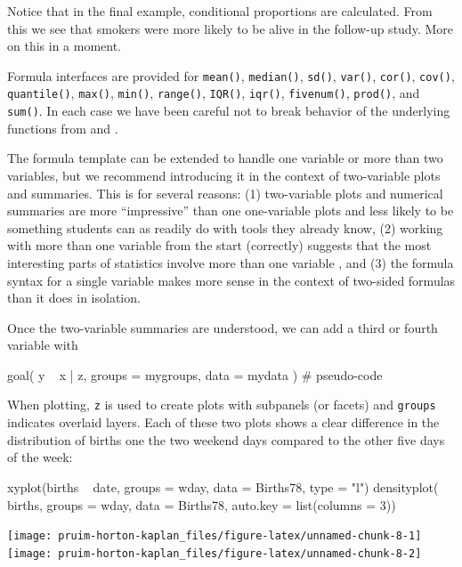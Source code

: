 Notice that in the final example, conditional proportions are
calculated. From this we see that smokers were more likely to be alive
in the follow-up study. More on this in a moment.

Formula interfaces are provided for \texttt{mean()}, \texttt{median()},
\texttt{sd()}, \texttt{var()}, \texttt{cor()}, \texttt{cov()},
\texttt{quantile()}, \texttt{max()}, \texttt{min()}, \texttt{range()},
\texttt{IQR()}, \texttt{iqr()}, \texttt{fivenum()}, \texttt{prod()}, and
\texttt{sum()}. In each case we have been careful not to break behavior
of the underlying functions from  and .

The formula template can be extended to handle one variable or more than
two variables, but we recommend introducing it in the context of
two-variable plots and summaries. This is for several reasons: (1)
two-variable plots and numerical summaries are more ``impressive'' than
one one-variable plots and less likely to be something students can as
readily do with tools they already know, (2) working with more than one
variable from the start (correctly) suggests that the most interesting
parts of statistics involve more than one variable
\citep{Wild:RSS:2011}, and (3) the formula syntax for a single variable
makes more sense in the context of two-sided formulas than it does in
isolation.

Once the two-variable summaries are understood, we can add a third or
fourth variable with

\begin{Schunk}
\begin{Sinput}
goal( y ~ x | z, groups = mygroups, data = mydata )    # pseudo-code
\end{Sinput}
\end{Schunk}

\noindent
When plotting, \texttt{z} is used to create plots with subpanels (or
facets) and \texttt{groups} indicates overlaid layers. Each of these two
plots shows a clear difference in the distribution of births one the two
weekend days compared to the other five days of the week:

\begin{Schunk}
\begin{Sinput}
xyplot(births ~ date, groups = wday, data = Births78, type = "l")
densityplot( ~ births, groups = wday, data = Births78, auto.key = list(columns = 3))
\end{Sinput}


\begin{center}\texttt{[image: pruim-horton-kaplan\_files/figure-latex/unnamed-chunk-8-1]} \texttt{[image: pruim-horton-kaplan\_files/figure-latex/unnamed-chunk-8-2]} \end{center}

\end{Schunk}

